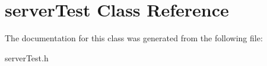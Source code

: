 \hypertarget{classserver_test}{\section{server\-Test Class Reference}
\label{classserver_test}
}


The documentation for this class was generated from the following file\-:\begin{DoxyCompactItemize}
\item 
server\-Test.\-h\end{DoxyCompactItemize}
